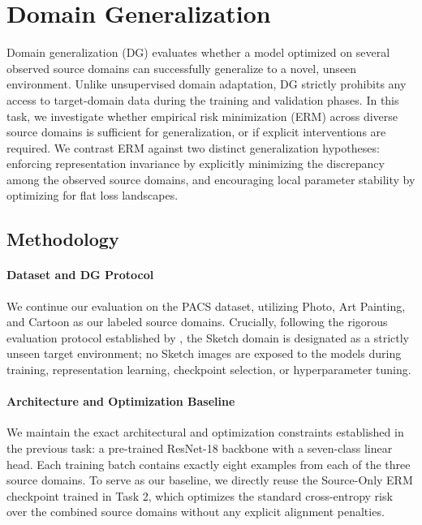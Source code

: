 \documentclass{article}
\begin{document}
\section{Domain Generalization}
\label{section:dg}


Domain generalization (DG) evaluates whether a model optimized on several observed source domains can successfully generalize to a novel, unseen environment. Unlike unsupervised domain adaptation, DG strictly prohibits any access to target-domain data during the training and validation phases. In this task, we investigate whether empirical risk minimization (ERM) across diverse source domains is sufficient for generalization, or if explicit interventions are required. We contrast ERM against two distinct generalization hypotheses: enforcing representation invariance by explicitly minimizing the discrepancy among the observed source domains, and encouraging local parameter stability by optimizing for flat loss landscapes. 

\subsection{Methodology}

\paragraph{Dataset and DG Protocol}
We continue our evaluation on the PACS dataset, utilizing Photo, Art Painting, and Cartoon as our labeled source domains. Crucially, following the rigorous evaluation protocol established by \citet{gulrajani2021in}, the Sketch domain is designated as a strictly unseen target environment; no Sketch images are exposed to the models during training, representation learning, checkpoint selection, or hyperparameter tuning.

\paragraph{Architecture and Optimization Baseline}
We maintain the exact architectural and optimization constraints established in the previous task: a pre-trained ResNet-18 backbone with a seven-class linear head. Each training batch contains exactly eight examples from each of the three source domains. To serve as our baseline, we directly reuse the Source-Only ERM checkpoint trained in Task 2, which optimizes the standard cross-entropy risk over the combined source domains without any explicit alignment penalties.
\end{document}
